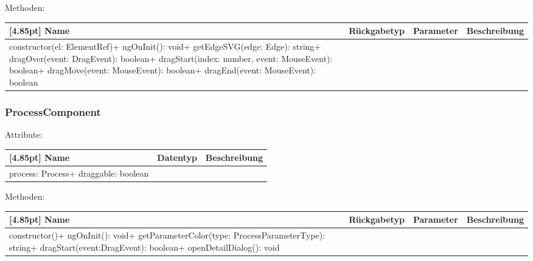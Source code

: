                 Methoden:
        		\begin{center}
                \setlength\tabcolsep{5pt}
                	\renewcommand{\arraystretch}{1.5}
                    	\begin{tabularx}{\textwidth}{|l|l|l|X|}
                    	\hline
                    	\rowcolor[gray]{0.75}[4.85pt]
                		Name & Rückgabetyp & Parameter & Beschreibung \\ \hline
                		constructor(el: ElementRef)+ ngOnInit(): void+ getEdgeSVG(edge: Edge): string+ dragOver(event: DragEvent): boolean+ dragStart(index: number, event: MouseEvent): boolean+ dragMove(event: MouseEvent): boolean+ dragEnd(event: MouseEvent): boolean
                        & & &  \\ \hline
                        \end{tabularx}
        		\end{center}
        	
        	\subsubsection{ProcessComponent}
        	
        	    Attribute:
                \begin{center}
                	\renewcommand{\arraystretch}{1.5}
                    \setlength\tabcolsep{5pt}
                	\begin{tabularx}{\textwidth}{|l|l|X|}
                		\hline
                        \rowcolor[gray]{0.75}[4.85pt]            		
                        Name & Datentyp & Beschreibung \\ \hline
                        process: Process+ draggable: boolean
                        & &  \\ \hline
                	\end{tabularx}
                \end{center}
                
                Methoden:
        		\begin{center}
                \setlength\tabcolsep{5pt}
                	\renewcommand{\arraystretch}{1.5}
                    	\begin{tabularx}{\textwidth}{|l|l|l|X|}
                    	\hline
                    	\rowcolor[gray]{0.75}[4.85pt]
                		Name & Rückgabetyp & Parameter & Beschreibung \\ \hline
                		constructor()+ ngOnInit(): void+ getParameterColor(type: ProcessParameterType): string+ dragStart(event:DragEvent): boolean+ openDetailDialog(): void
                        & & &  \\ \hline
                        \end{tabularx}
        		\end{center}
        	
